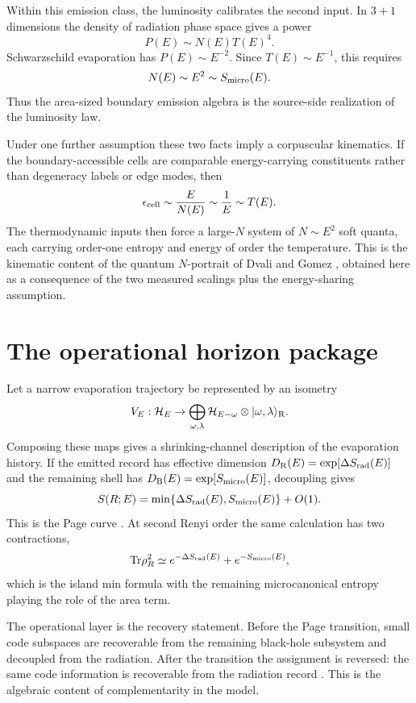 \documentclass[12pt]{article}
\newcommand{\be}{\begin{equation}}
\newcommand{\ee}{\end{equation}}
\newcommand{\Tr}{\mathrm{Tr}}
\newcommand{\Smicro}{S_{\rm micro}}
\newcommand{\ket}[1]{|#1\rangle}
\begin{document}
Within this emission class, the luminosity calibrates the second input.  In
$3+1$ dimensions the density of radiation phase space gives a power
\be
  P(E)\sim N(E) T(E)^4 .
\ee
Schwarzschild evaporation has $P(E)\sim E^{-2}$.  Since $T(E)\sim E^{-1}$,
this requires
\be
  N(E)\sim E^2\sim \Smicro(E).
\ee
Thus the area-sized boundary emission algebra is the source-side realization
of the luminosity law.

Under one further assumption these two facts imply a corpuscular kinematics.
If the boundary-accessible cells are comparable energy-carrying constituents
rather than degeneracy labels or edge modes, then
\be
  \epsilon_{\rm cell}\sim \frac{E}{N(E)}\sim \frac{1}{E}\sim T(E).
\ee
The thermodynamic inputs then force a large-$N$ system of $N\sim E^2$ soft
quanta, each carrying order-one entropy and energy of order the temperature.
This is the kinematic content of the quantum $N$-portrait of Dvali and Gomez
\cite{DvaliGomez2013}, obtained here as a consequence of the two measured
scalings plus the energy-sharing assumption.

\section{The operational horizon package}

Let a narrow evaporation trajectory be represented by an isometry
\be
  V_E:\mathcal H_E\to
  \bigoplus_{\omega,\lambda}
  \mathcal H_{E-\omega}\otimes
  \ket{\omega,\lambda}_{\rm R}.
\ee
Composing these maps gives a shrinking-channel description of the evaporation
history.  If the emitted record has effective dimension
$D_{\rm R}(E)=\exp[\Delta S_{\rm rad}(E)]$ and the remaining shell has
$D_{\rm B}(E)=\exp[\Smicro(E)]$, decoupling gives
\be
  S(R;E)=
  \min\{\Delta S_{\rm rad}(E),\Smicro(E)\}+O(1).
\ee
This is the Page curve \cite{Page1993Average}.  At second Renyi order the
same calculation has two
contractions,
\be
  \Tr \rho_R^2
  \simeq
  e^{-\Delta S_{\rm rad}(E)}+
  e^{-\Smicro(E)},
\ee
which is the island min formula with the remaining microcanonical entropy
playing the role of the area term.

The operational layer is the recovery statement.  Before the Page transition,
small code subspaces are recoverable from the remaining black-hole subsystem
and decoupled from the radiation.  After the transition the assignment is
reversed: the same code information is recoverable from the radiation record
\cite{HaydenPreskill2007}.
This is the algebraic content of complementarity in the model.
\end{document}
